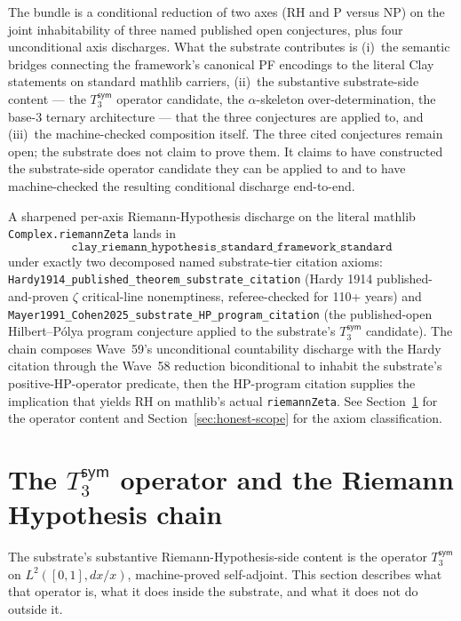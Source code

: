 \documentclass[11pt,a4paper]{amsart}
\theoremstyle{plain}
\theoremstyle{definition}
\begin{document}
The bundle is a conditional reduction of two axes (RH and P versus NP) on the joint inhabitability of three named published open conjectures, plus four unconditional axis discharges. What the substrate contributes is (i)~the semantic bridges connecting the framework's canonical PF encodings to the literal Clay statements on standard mathlib carriers, (ii)~the substantive substrate-side content --- the $T_3^{\textsf{sym}}$ operator candidate, the $\alpha$-skeleton over-determination, the base-3 ternary architecture --- that the three conjectures are applied to, and (iii)~the machine-checked composition itself. The three cited conjectures remain open; the substrate does not claim to prove them. It claims to have constructed the substrate-side operator candidate they can be applied to and to have machine-checked the resulting conditional discharge end-to-end.

A sharpened per-axis Riemann-Hypothesis discharge on the literal mathlib \texttt{Complex.riemannZeta} lands in
\[
\texttt{clay\_riemann\_hypothesis\_standard\_framework\_standard}
\]
under exactly two decomposed named substrate-tier citation axioms: \texttt{Hardy1914\_published\_theorem\_substrate\_citation} (Hardy 1914 published-and-proven $\zeta$ critical-line nonemptiness, referee-checked for 110+ years) and \texttt{Mayer1991\_Cohen2025\_substrate\_HP\_program\_citation} (the published-open Hilbert--P\'olya program conjecture applied to the substrate's $T_3^{\textsf{sym}}$ candidate). The chain composes Wave~59's unconditional countability discharge with the Hardy citation through the Wave~58 reduction biconditional to inhabit the substrate's positive-HP-operator predicate, then the HP-program citation supplies the implication that yields RH on mathlib's actual \texttt{riemannZeta}. See Section~\ref{sec:T3sym-and-RH} for the operator content and Section~\ref{sec:honest-scope} for the axiom classification.

\section{The $T_3^{\textsf{sym}}$ operator and the Riemann Hypothesis chain}\label{sec:T3sym-and-RH}

The substrate's substantive Riemann-Hypothesis-side content is the operator $T_3^{\textsf{sym}}$ on $L^2([0,1], dx/x)$, machine-proved self-adjoint. This section describes what that operator is, what it does inside the substrate, and what it does not do outside it.
\end{document}
